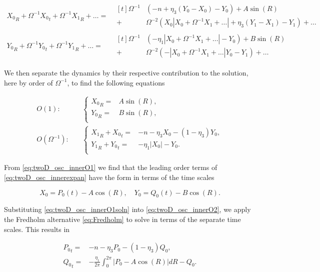 \begin{equation*}
\begin{aligned}
{X_0}_R+\Omega^{-1}{X_0}_t+\Omega^{-1}{X_1}_R+\ldots=&\begin{aligned}[t]\Omega^{-1}&(-n+\eta_3(Y_0-X_0)-Y_0)+A\sin(R)\\
+&\Omega^{-2}(X_0|X_0+\Omega^{-1}X_1+\ldots|+\eta_3(Y_1-X_1)-Y_1)+\ldots
\end{aligned}\\
{Y_0}_R+\Omega^{-1}{Y_0}_t+\Omega^{-1}{Y_1}_R+\ldots=&\begin{aligned}[t]\Omega^{-1}&(-\eta_1|X_0+\Omega^{-1}X_1+\ldots|-Y_0)+B\sin(R)\\
+&\Omega^{-2}(-|X_0+\Omega^{-1}X_1+\ldots|Y_0-Y_1)+\ldots
\end{aligned}
\end{aligned}
\end{equation*}

We then separate the dynamics by their respective contribution to the solution, here by order of $\Omega^{-1}$, to find the following equations

\begin{align}
\label{eq:twoD_osc_innerO1}
O(1):\quad & \begin{cases}
	{X_0}_R =& A\sin(R), \\
	{Y_0}_R =& B\sin(R),\\
\end{cases}\\
\label{eq:twoD_osc_innerO2}
O(\Omega^{-1}):\quad & \begin{cases}
	{X_1}_R+{X_0}_t =& -n-\eta_3X_0-(1-\eta_3)Y_0, \\
	{Y_1}_R+{Y_0}_t =& -\eta_1|X_0|-Y_0.\\
\end{cases}
\end{align}

From \eqref{eq:twoD_osc_innerO1} we find that the leading order terms of \eqref{eq:twoD_osc_innerexpan} have the form in terms of the time scales

\begin{equation}\label{eq:twoD_osc_innerO1soln}
X_0=P_0(t)-A\cos(R),\quad Y_0=Q_0(t)-B\cos(R).
\end{equation}
 
Substituting \eqref{eq:twoD_osc_innerO1soln} into \eqref{eq:twoD_osc_innerO2}, we apply the Fredholm alternative \eqref{eq:Fredholm} to solve in terms of the separate time scales. This results in

\begin{equation}\label{eq:twoD_osc_innerintegral}
\begin{aligned}
{P_0}_t =& -n -\eta_3P_0-(1-\eta_3)Q_0,\\
{Q_0}_t =& -\frac{\eta_1}{2\pi}\int_0^{2\pi}|P_0-A\cos(R)|dR-Q_0.
\end{aligned}
\end{equation}

